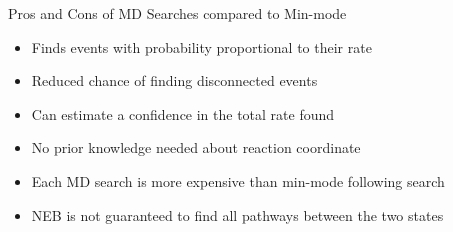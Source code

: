 \documentclass[onlymath]{beamer}
\begin{document}
\begin{frame}{Pros and Cons of MD Searches compared to Min-mode}
 \begin{tcolorbox}[title=Pros,colback=white,colframe=green!50!black,]
    \begin{itemize}
	\item Finds events with probability proportional to their rate
	\item Reduced chance of finding disconnected events
	\item Can estimate a confidence in the total rate found
	\item No prior knowledge needed about reaction coordinate
    \end{itemize}
  \end{tcolorbox}

  \vspace{2mm}

  \begin{tcolorbox}[title=Cons,colback=white,colframe=red!50!black,]
    \begin{itemize}
	\item Each MD search is more expensive than min-mode following search
	\item NEB is not guaranteed to find all pathways between the two states 
    \end{itemize}
  \end{tcolorbox}
\end{frame}
\end{document}
